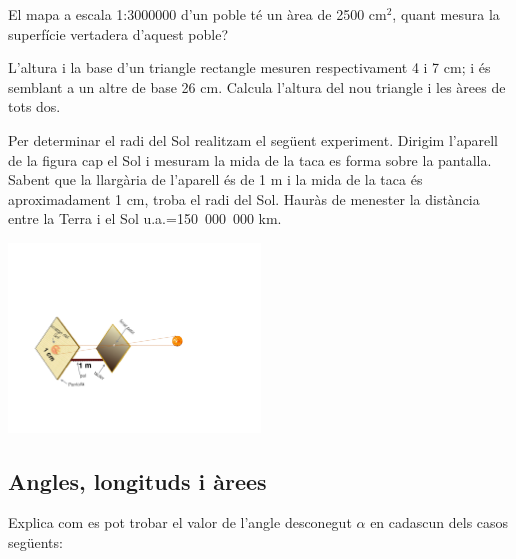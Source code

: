 \begin{activitats}
\begin{mylist}

\exer  El mapa a escala 1:3000000 d'un poble té un àrea de 2500 cm${}^{2}$, quant mesura la superfície vertadera d'aquest poble?


\exer  L'altura i la base d'un triangle rectangle mesuren respectivament 4 i 7 cm; i és semblant a un altre de base 26 cm. Calcula l'altura del nou triangle i les àrees de tots dos.


\item \simbolsearch Per determinar el radi del Sol realitzam el següent experiment. Dirigim l'aparell de la figura cap el Sol i mesuram la mida de la taca es forma sobre la pantalla. Sabent que la llargària de l'aparell és de 1 m i la mida de la taca és aproximadament 1 cm, troba el radi del Sol. Hauràs de menester la distància entre la Terra i el Sol  u.a.=150\, 000\, 000 km. 
\begin{center}
	\includegraphics[width=6.7cm]{img-09/experiment-sol}
\end{center}
\end{mylist}
 
 


\subsection{Angles, longituds i àrees}

\begin{mylist} 
	
\exer Explica com es pot trobar el valor de l'angle desconegut $\alpha$ en cadascun dels casos següents:


\end{mylist}
\end{activitats}

